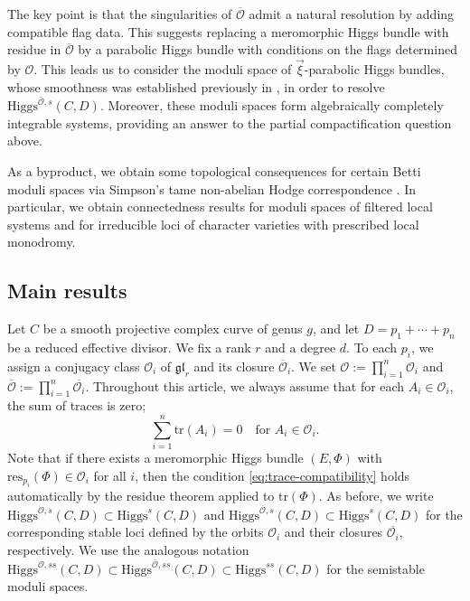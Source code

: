 \documentclass[11pt]{amsart}
\theoremstyle{plain}
\theoremstyle{definition}
\theoremstyle{remark}
\newcommand{\ov}[1]{\overline{#1}}
\newcommand{\cO}{\mathcal O}
\newcommand{\Higgs}{\mathrm{Higgs}}
\newcommand{\tr}{\mathrm{tr}}
\def\res{\mathrm{res}}
\def\vxi{\vec{\xi}}
\begin{document}
The key point is that the singularities of $\overline{\cO}$ admit a natural resolution by adding compatible flag data. This suggests replacing a meromorphic Higgs bundle with residue in $\overline{\cO}$ by a parabolic Higgs bundle with conditions on the flags determined by $\cO$. This leads us to consider the moduli space of $\vxi$-parabolic Higgs bundles, whose smoothness was established previously in \cite{LeeLee2024,LeeLee2025}, in order to resolve $\Higgs^{\overline{\cO}, s}(C,D)$. Moreover,  these moduli spaces form algebraically completely integrable systems, providing an answer to the partial compactification question above.


As a byproduct, we obtain some topological consequences for certain Betti moduli spaces via Simpson's tame non-abelian Hodge correspondence \cite{simpson-noncompact}. In particular, we obtain connectedness results for moduli spaces of filtered local systems and for irreducible loci of character varieties with prescribed local monodromy. 


\subsection{Main results}
Let $C$ be a smooth projective complex curve of genus $g$, and let $D=p_1+\cdots+p_n$ be a reduced effective divisor. We fix a rank $r$ and a degree $d$. To each $p_i$, we assign a conjugacy class $\cO_i$ of $\mathfrak{gl}_r$ and its closure $\ov\cO_i$. We set $\cO:=\prod_{i=1}^n \cO_i$ and $\ov{\cO}:=\prod_{i=1}^n \ov{\cO_i}$. Throughout this article, we always assume that for each $A_i \in \cO_i$, the sum of traces is zero;
\begin{equation}\label{eq:trace-compatibility}
\sum_{i=1}^n\tr(A_i)=0 \quad \text{for }A_i \in \cO_i. 
\end{equation}
Note that if there exists a meromorphic Higgs bundle $(E,\Phi)$ with
$\res_{p_i}(\Phi)\in \cO_i$ for all $i$, then the condition
\eqref{eq:trace-compatibility} holds automatically by the residue theorem applied to $\tr(\Phi)$. As before, we write
$\Higgs^{\cO,s}(C,D)\subset \Higgs^s(C,D)$ and
$\Higgs^{\ov{\cO},s}(C,D)\subset \Higgs^s(C,D)$ for the corresponding stable
loci defined by the orbits $\cO_i$ and their closures $\ov{\cO_i}$, respectively.
We use the analogous notation
$\Higgs^{\cO,ss}(C,D)\subset \Higgs^{\ov{\cO},ss}(C,D)\subset
\Higgs^{ss}(C,D)$ for the semistable moduli spaces.
\end{document}
